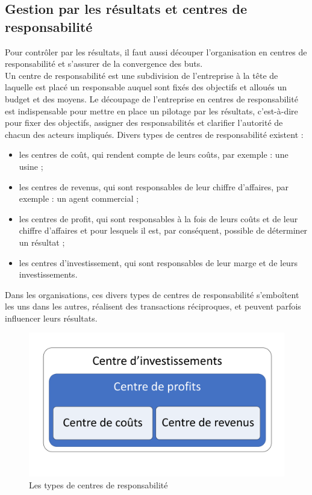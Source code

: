 \documentclass{tufte-handout}
\begin{document}
\subsection{Gestion par les résultats et centres de responsabilité}
\label{sec:org901c160}
Pour contrôler par les résultats, il faut aussi découper l’organisation en centres de responsabilité et s’assurer de la convergence des buts.\\
Un centre de responsabilité est une subdivision de l’entreprise à la tête de laquelle est placé un responsable auquel sont fixés des objectifs et alloués un budget et des moyens. Le découpage de l’entreprise en centres de responsabilité est indispensable pour mettre en place un pilotage par les résultats, c’est-à-dire pour fixer des objectifs, assigner des responsabilités et clarifier l’autorité de chacun des acteurs impliqués. Divers types de centres de responsabilité existent :\\
\begin{itemize}
\item les centres de coût, qui rendent compte de leurs coûts, par exemple : une usine ;\\
\item les centres de revenus, qui sont responsables de leur chiffre d’affaires, par exemple : un agent commercial ;\\
\item les centres de profit, qui sont responsables à la fois de leurs coûts et de leur chiffre d’affaires et pour lesquels il est, par conséquent, possible de déterminer un résultat ;\\
\item les centres d’investissement, qui sont responsables de leur marge et de leurs investissements.\\
\end{itemize}
Dans les organisations, ces divers types de centres de responsabilité s’emboîtent les uns dans les autres, réalisent des transactions réciproques, et peuvent parfois influencer leurs résultats.\\
\begin{figure}[htbp]
\centering
\includegraphics[width=.9\linewidth]{./img/centres.pdf}
\caption{Les types de centres de responsabilité}
\end{figure}
\end{document}
